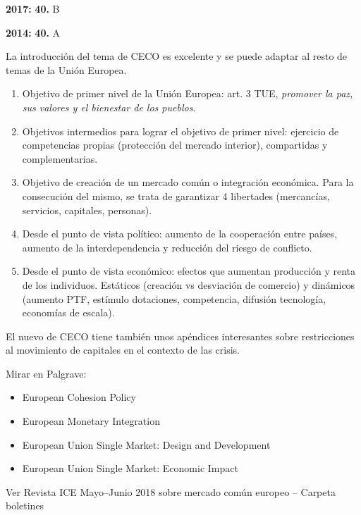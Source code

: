 \documentclass{nuevotema}
\begin{document}
\textbf{2017:} \textbf{40.} B

\textbf{2014:} \textbf{40.} A

La introducción del tema de CECO es excelente y se puede adaptar al resto de temas de la Unión Europea.

\begin{enumerate}
	\item Objetivo de primer nivel de la Unión Europea: art. 3 TUE, \textit{promover la paz, sus valores y el bienestar de los pueblos}.
	\item Objetivos intermedios para lograr el objetivo de primer nivel: ejercicio de competencias propias (protección del mercado interior), compartidas y complementarias.
	\item Objetivo de creación de un mercado común o integración económica. Para la consecución del mismo, se trata de garantizar 4 libertades (mercancías, servicios, capitales, personas).
	\item Desde el punto de vista político: aumento de la cooperación entre países, aumento de la interdependencia y reducción del riesgo de conflicto.
	\item Desde el punto de vista económico: efectos que aumentan producción y renta de los individuos. Estáticos (creación vs desviación de comercio) y dinámicos (aumento PTF, estímulo dotaciones, competencia, difusión tecnología, economías de escala).
\end{enumerate}

El nuevo de CECO tiene también unos apéndices interesantes sobre restricciones al movimiento de capitales en el contexto de las crisis.


\bibliografia

Mirar en Palgrave:
\begin{itemize}
	\item European Cohesion Policy
	\item European Monetary Integration
	\item European Union Single Market: Design and Development
	\item European Union Single Market: Economic Impact
\end{itemize}

Ver Revista ICE Mayo--Junio 2018 sobre mercado común europeo -- Carpeta boletines
\end{document}
